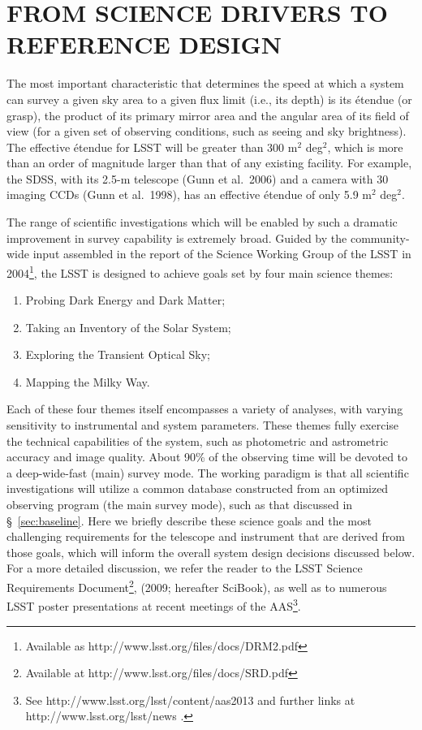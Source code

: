 \section{  FROM SCIENCE DRIVERS TO REFERENCE DESIGN}
\label{Sec:refdesign}

The most important characteristic that determines the speed at which a system can
survey a given sky area to a given flux limit (i.e., its depth) is its \'etendue
(or grasp), the product of its primary mirror area and the angular
area of its field of view (for a given set of observing conditions, such as
seeing and sky brightness).
The effective \'etendue for LSST will be greater than 300 m$^2$ deg$^2$, which
is more than an order of magnitude larger than that of any existing facility.
For example, the SDSS, with its 2.5-m telescope (Gunn et al.~2006) and a
camera with 30 imaging CCDs (Gunn et al.~1998), has an effective \'etendue of
only 5.9 m$^2$ deg$^2$.

The range of scientific investigations which will be enabled by such a
dramatic improvement in survey capability is extremely broad. Guided by
the community-wide input assembled in the report of the Science Working Group of the
LSST in 2004\footnote{Available as
http://www.lsst.org/files/docs/DRM2.pdf}, the LSST is designed to
achieve goals set by four main science themes:

\begin{enumerate}
\item Probing Dark Energy and Dark Matter;
\item Taking an Inventory of the Solar System;
\item Exploring the Transient Optical Sky;
\item Mapping the Milky Way.
\end{enumerate}

Each of these four themes itself encompasses a variety of analyses, with
varying sensitivity to instrumental and system parameters. These themes
fully exercise the technical capabilities of the system, such as photometric
and astrometric accuracy and image quality. About 90\% of the observing time
will be devoted to a deep-wide-fast (main) survey mode. The working paradigm is that all
scientific investigations will utilize a common database constructed from an optimized
observing program (the main survey mode), such as that discussed in
\S~\ref{sec:baseline}.
Here we briefly describe these science goals and the most challenging requirements for the
telescope and instrument that are derived from those goals, which will
inform the overall system design decisions discussed below.
For a more detailed discussion, we refer the reader to the LSST Science Requirements
Document\footnote{Available at
http://www.lsst.org/files/docs/SRD.pdf},
(2009; hereafter SciBook),
as well as to numerous LSST poster presentations at recent
meetings of the AAS\footnote{See
http://www.lsst.org/lsst/content/aas2013 and further links at
http://www.lsst.org/lsst/news .}.


